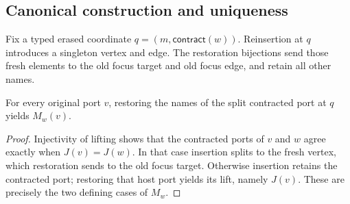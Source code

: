 \subsection{Canonical construction and uniqueness}
Fix a typed erased coordinate $q=(m,\mathsf{contract}(w))$. Reinsertion at $q$
introduces a singleton vertex and edge. The restoration bijections send those
fresh elements to the old focus target and old focus edge, and retain all
other names.
\begin{lemma}
For every original port $v$, restoring the names of the split contracted port
at $q$ yields $M_w(v)$.
\end{lemma}
\begin{proof}
Injectivity of lifting shows that the contracted ports of $v$ and $w$ agree
exactly when $J(v)=J(w)$. In that case insertion splits to the fresh vertex,
which restoration sends to the old focus target. Otherwise insertion retains
the contracted port; restoring that host port yields its lift, namely $J(v)$.
These are precisely the two defining cases of $M_w$.
\end{proof}

